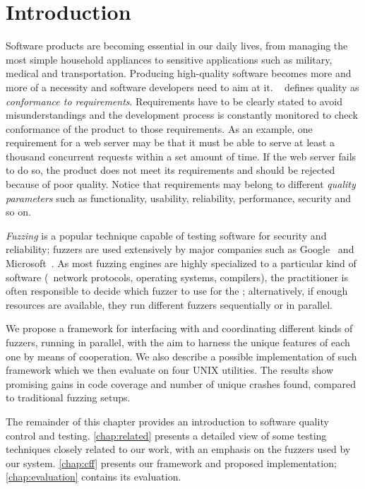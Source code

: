 \chapter{Introduction}
\label{chap:intro}

Software products are becoming essential in our daily lives, from managing the
most simple household appliances to sensitive applications such as military,
medical and transportation. Producing high-quality software becomes more and
more of a necessity and software developers need to aim at it.
\citeauthor{crosby1979art}~\cite{crosby1979art} defines quality as
\emph{conformance to requirements}. Requirements have to be clearly stated to
avoid misunderstandings and the development process is constantly monitored to
check conformance of the product to those requirements. As an example, one
requirement for a web server may be that it must be able to serve at least a
thousand concurrent requests within a set amount of time. If the web server
fails to do so, the product does not meet its requirements and should be
rejected because of poor quality. Notice that requirements may belong to
different \emph{quality parameters} such as functionality, usability,
reliability, performance, security and so on.

\emph{Fuzzing} is a popular technique capable of testing software for security
and reliability; fuzzers are used extensively by major companies such as
Google~\cite{google2016fuzz,google2011fuzz,google2016oss,google2017oss} and
Microsoft~\cite{microsoft2017srd,microsoft2017neural,microsoft2018ai}. As most
fuzzing engines are highly specialized to a particular kind of software (\eg\
network protocols, operating systems, compilers), the practitioner is often
responsible to decide which fuzzer to use for the \sut; alternatively, if enough
resources are available, they run different fuzzers sequentially or in parallel.

We propose a framework for interfacing with and coordinating different kinds of
fuzzers, running in parallel, with the aim to harness the unique features of
each one by means of cooperation. We also describe a possible implementation of
such framework which we then evaluate on four UNIX utilities. The results show
promising gains in code coverage and number of unique crashes found, compared to
traditional fuzzing setups.

The remainder of this chapter provides an introduction to software quality
control and testing. \autoref{chap:related} presents a detailed view of some
testing techniques closely related to our work, with an emphasis on the fuzzers
used by our system. \autoref{chap:cff} presents our framework and proposed
implementation; \autoref{chap:evaluation} contains its evaluation.

